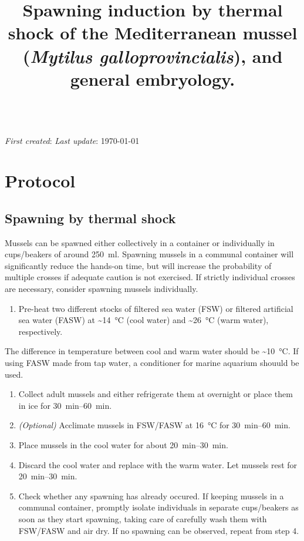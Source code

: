 \documentclass[10pt]{report}
\makeatletter
\renewcommand\maketitle{
{\begin{center}
{\Large \bfseries \@title }\\
{\small \emph{First created}: \DTMdisplaydate{2023}{11}{28}{-1}\hfill%
\setstretch{1.0} \small \hfill \emph{Last update}: \today}
\end{center}}} %
\makeatother
\begin{document}

\title{\vspace{-3em} Spawning induction by thermal shock of the Mediterranean mussel (\emph{Mytilus galloprovincialis}), and general embryology.}
\maketitle
\thispagestyle{plain}

\section*{\vspace{-1em} \textendash{} Protocol \textendash{}}

\subsection*{Spawning by thermal shock}

\alert{Mussels can be spawned either collectively in a container or individually in cups/beakers of around \qty{250}{\ml}. Spawning mussels in a communal container will significantly reduce the hands-on time, but will increase the probability of multiple crosses if adequate caution is not exercised. If strictly individual crosses are necessary, consider spawning mussels individually.}

\begin{enumerate}[series = steps]
	\item Pre-heat two different stocks of filtered sea water (FSW) or filtered artificial sea water (FASW) at \qty{~14}{\degreeCelsius} (cool water) and \qty{~26}{\degreeCelsius} (warm water), respectively.
\end{enumerate}

\bigskip\alert{The difference in temperature between cool and warm water should be \qty{~10}{\degreeCelsius}.}
\alert{If using FASW made from tap water, a conditioner for marine aquarium shouuld be used.}

\begin{enumerate}[resume = steps]
	\item Collect adult mussels and either refrigerate them at \fourdegree{} overnight or place them in ice for \qtyrange{30}{60}{\minute}.
	\item \textit{(Optional)} Acclimate mussels in FSW/FASW at \qty{16}{\degreeCelsius} for \qtyrange{30}{60}{\minute}.
	\item Place mussels in the cool water for about \qtyrange{20}{30}{\minute}.
	\item Discard the cool water and replace with the warm water. Let mussels rest for \qtyrange{20}{30}{\minute}.
	\item Check whether any spawning has already occured. If keeping mussels in a communal container, promptly isolate individuals in separate cups/beakers as soon as they start spawning, taking care of carefully wash them with FSW/FASW and air dry. If no spawning can be observed, repeat from step 4.
\end{enumerate}
\end{document}
